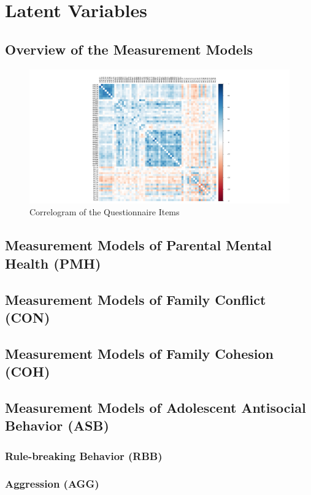 \section{Latent Variables}\label{app:latent}

\subsection{Overview of the Measurement Models}

\begin{figure}[htbp]
    \caption{Correlogram of the Questionnaire Items}
    \label{fig:heat}
    \includegraphics[width=\textwidth]{./Figures/heat_map.pdf}
\end{figure}

\subsection{Measurement Models of Parental Mental Health (PMH)}

\subsection{Measurement Models of Family Conflict (CON)}

\subsection{Measurement Models of Family Cohesion (COH)}

\subsection{Measurement Models of Adolescent Antisocial Behavior (ASB)}

\subsubsection{Rule-breaking Behavior (RBB)}

\subsubsection{Aggression (AGG)}
